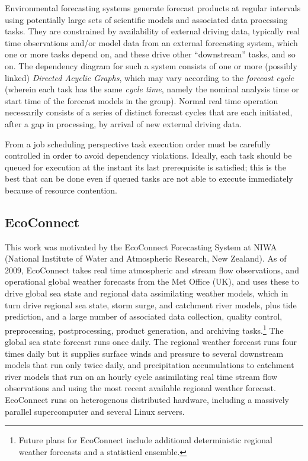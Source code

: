 \documentclass[11pt,a4paper]{article}
\begin{document}
Environmental forecasting systems generate forecast products at regular
intervals using potentially large sets of scientific models and
associated data processing tasks. They are constrained by availability
of external driving data, typically real time observations and/or model
data from an external forecasting system, which one or more tasks depend
on, and these drive other ``downstream'' tasks, and so on. The
dependency diagram for such a system consists of one or more (possibly
linked) {\em Directed Acyclic Graphs}, which may vary according to the
{\em forecast cycle} (wherein each task has the same {\em cycle time},
namely the nominal analysis time or start time of the forecast models in
the group). Normal real time operation necessarily consists of a series
of distinct forecast cycles that are each initiated, after a gap in
processing, by arrival of new external driving data.

From a job scheduling perspective task execution order must be carefully
controlled in order to avoid dependency violations. Ideally, each task
should be queued for execution at the instant its last prerequisite is
satisfied; this is the best that can be done even if queued tasks are
not able to execute immediately because of resource contention.


\subsection{EcoConnect} 
\label{EcoConnect}

This work was motivated by the EcoConnect Forecasting System at NIWA
(National Institute of Water and Atmospheric Research, New Zealand). As
of 2009, EcoConnect takes real time atmospheric and stream flow
observations, and operational global weather forecasts from the Met
Office (UK), and uses these to drive global sea state and regional data
assimilating weather models, which in turn drive regional sea state,
storm surge, and catchment river models, plus tide prediction, and a
large number of associated data collection, quality control,
preprocessing, postprocessing, product generation, and archiving
tasks.\footnote{Future plans for EcoConnect include additional
deterministic regional weather forecasts and a statistical ensemble.}
The global sea state forecast runs once daily.  The regional weather
forecast runs four times daily but it supplies surface winds and
pressure to several downstream models that run only twice daily, and
precipitation accumulations to catchment river models that run on an
hourly cycle assimilating real time stream flow observations and using
the most recent available regional weather forecast.  EcoConnect runs on
heterogenous distributed hardware, including a massively parallel
supercomputer and several Linux servers. 
\end{document}
